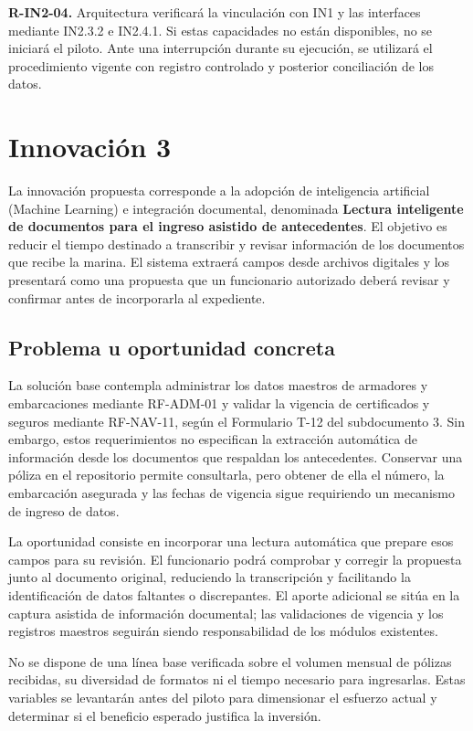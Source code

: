 \textbf{R-IN2-04.}
Arquitectura verificará la vinculación con IN1 y las interfaces
mediante IN2.3.2 e IN2.4.1. Si estas capacidades no están
disponibles, no se iniciará el piloto. Ante una interrupción
durante su ejecución, se utilizará el procedimiento vigente
con registro controlado y posterior conciliación de los datos.
\newpage

\section{Innovación 3}

La innovación propuesta corresponde a la adopción de inteligencia artificial (Machine Learning) e integración documental, denominada \textbf{Lectura inteligente de documentos para el ingreso asistido de antecedentes}. El objetivo es reducir el tiempo destinado a transcribir y revisar información de los documentos que recibe la marina. El sistema extraerá campos desde archivos digitales y los presentará como una propuesta que un funcionario autorizado deberá revisar y confirmar antes de incorporarla al expediente.

\subsection{Problema u oportunidad concreta}

La solución base contempla administrar los datos maestros de armadores y embarcaciones mediante RF-ADM-01 y validar la vigencia de certificados y seguros mediante RF-NAV-11, según el Formulario T-12 del subdocumento 3. Sin embargo, estos requerimientos no especifican la extracción automática de información desde los documentos que respaldan los antecedentes. Conservar una póliza en el repositorio permite consultarla, pero obtener de ella el número, la embarcación asegurada y las fechas de vigencia sigue requiriendo un mecanismo de ingreso de datos.

La oportunidad consiste en incorporar una lectura automática que prepare esos campos para su revisión. El funcionario podrá comprobar y corregir la propuesta junto al documento original, reduciendo la transcripción y facilitando la identificación de datos faltantes o discrepantes. El aporte adicional se sitúa en la captura asistida de información documental; las validaciones de vigencia y los registros maestros seguirán siendo responsabilidad de los módulos existentes.

No se dispone de una línea base verificada sobre el volumen mensual de pólizas recibidas, su diversidad de formatos ni el tiempo necesario para ingresarlas. Estas variables se levantarán antes del piloto para dimensionar el esfuerzo actual y determinar si el beneficio esperado justifica la inversión.

